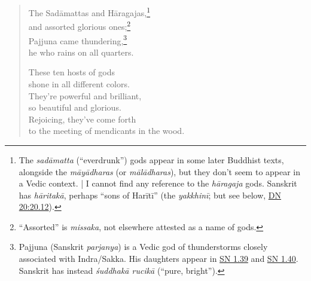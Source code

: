 \documentclass[12pt,openany]{book}%
\begin{document}
\begin{verse}
The \textsanskrit{Sadāmattas} and \textsanskrit{Hāragajas},\footnote{The \textit{\textsanskrit{sadāmatta}} (“everdrunk”) gods appear in some later Buddhist texts, alongside the \textit{\textsanskrit{māyādharas}} (or \textit{\textsanskrit{mālādharas}}), but they don’t seem to appear in a Vedic context. | I cannot find any reference to the \textit{\textsanskrit{hāragaja}} gods.  Sanskrit has \textit{\textsanskrit{hāritakā}}, perhaps “sons of \textsanskrit{Harītī}” (the \textit{\textsanskrit{yakkhinī}}; but see below, \href{https://suttacentral.net/dn20/en/sujato\#20.12}{DN 20:20.12}). } \\
and assorted glorious ones;\footnote{“Assorted” is \textit{missaka}, not elsewhere attested as a name of gods. } \\
Pajjuna came thundering,\footnote{Pajjuna (Sanskrit \textit{parjanya}) is a Vedic god of thunderstorms closely associated with Indra/Sakka. His daughters appear in \href{https://suttacentral.net/sn1.39/en/sujato}{SN 1.39} and \href{https://suttacentral.net/sn1.40/en/sujato}{SN 1.40}. Sanskrit has instead \textit{\textsanskrit{śuddhakā} \textsanskrit{rucikā}} (“pure, bright”). } \\
he who rains on all quarters. 

These ten hosts of gods \\
shone in all different colors. \\
They’re powerful and brilliant, \\
so beautiful and glorious. \\
Rejoicing, they’ve come forth \\
to the meeting of mendicants in the wood. 


\end{verse}
\end{document}
